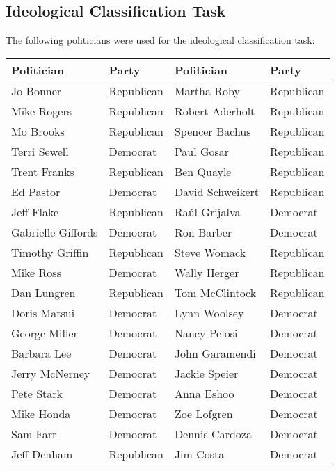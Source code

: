 \documentclass[10pt,11pt,12pt,oneside]{book}
\begin{document}
\begin{appendices}
	\section{Ideological Classification Task}
	The following politicians were used for the ideological classification task:\\
\begin{table}[H]
	\tiny
	\begin{tabular}{|p{2in}|p{0.5in}||p{2in}|p{0.5in}|}
		
		\hline
		Politician & Party & Politician & Party\\ \hline
		Jo Bonner & Republican & Martha Roby & Republican\\ \hline
		Mike Rogers & Republican & Robert Aderholt & Republican\\ \hline
		Mo Brooks & Republican & Spencer Bachus & Republican\\ \hline
		Terri Sewell & Democrat & Paul Gosar & Republican\\ \hline
		Trent Franks & Republican & Ben Quayle & Republican\\ \hline
		Ed Pastor & Democrat & David Schweikert & Republican\\ \hline
		Jeff Flake & Republican & Raúl Grijalva & Democrat\\ \hline
		Gabrielle Giffords & Democrat & Ron Barber & Democrat\\ \hline
		Timothy Griffin & Republican & Steve Womack & Republican\\ \hline
		Mike Ross & Democrat & Wally Herger & Republican\\ \hline
		Dan Lungren & Republican & Tom McClintock & Republican\\ \hline
		Doris Matsui & Democrat & Lynn Woolsey & Democrat\\ \hline
		George Miller & Democrat & Nancy Pelosi & Democrat\\ \hline
		Barbara Lee & Democrat & John Garamendi & Democrat\\ \hline
		Jerry McNerney & Democrat & Jackie Speier & Democrat\\ \hline
		Pete Stark & Democrat & Anna Eshoo & Democrat\\ \hline
		Mike Honda & Democrat & Zoe Lofgren & Democrat\\ \hline
		Sam Farr & Democrat & Dennis Cardoza & Democrat\\ \hline
		Jeff Denham & Republican & Jim Costa & Democrat\\ \hline

\end{tabular}
\end{table}
\end{appendices}
\end{document}
